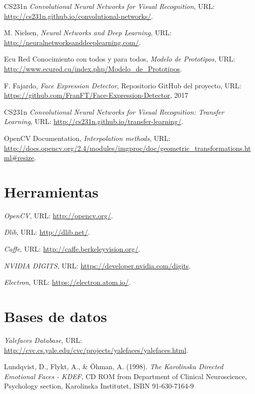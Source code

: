 \documentclass[a4paper,11pt]{book}
\begin{document}
\begin{thebibliography}{99}
	CS231n  
	\textit{Convolutional Neural Networks for Visual Recognition}, 
	URL: \url{http://cs231n.github.io/convolutional-networks/}.
	
	M. Nielsen,   
	\textit{Neural Networks and Deep Learning}, 
	URL: \url{http://neuralnetworksanddeeplearning.com/}.
	
	Ecu Red Conocimiento con todos y para todos,   
	\textit{Modelo de Prototipos}, 
	URL: \url{http://www.ecured.cu/index.php/Modelo_de_Prototipos}.
	
	F. Fajardo,   
	\textit{Face Expression Detector}, 
	Repositorio GitHub del proyecto, 
	URL: \url{https://github.com/FranFT/Face-Expression-Detector}, 
	2017
	
	CS231n  
	\textit{Convolutional Neural Networks for Visual Recognition: Transfer Learning}, 
	URL: \url{http://cs231n.github.io/transfer-learning/}.
	
	OpenCV Documentation,  
	\textit{Interpolation methods}, 
	URL: \url{	http://docs.opencv.org/2.4/modules/imgproc/doc/geometric_transformations.html#resize}.

	
	
	\section{Herramientas}
	\textit{OpenCV}, 
	URL: \url{http://opencv.org/}.
	
	\textit{Dlib}, 
	URL: \url{http://dlib.net/}.
	
	\textit{Caffe}, 
	URL: \url{http://caffe.berkeleyvision.org/}.
	
	\textit{NVIDIA DIGITS}, 
	URL: \url{https://developer.nvidia.com/digits}.
	
	\textit{Electron}, 
	URL: \url{https://electron.atom.io/}.
	
	\section{Bases de datos}
	\textit{Yalefaces Database}, 
	URL: \url{	http://cvc.cs.yale.edu/cvc/projects/yalefaces/yalefaces.html}.
	
	Lundqvist, D., Flykt, A., \& Öhman, A. (1998). %
	\textit{The Karolinska Directed Emotional Faces - KDEF}, %
	CD ROM from Department of Clinical Neuroscience, Psychology section, Karolinska Institutet, ISBN 91-630-7164-9
	
	

	
\end{thebibliography}
\end{document}
